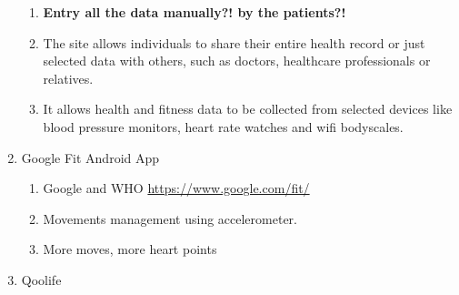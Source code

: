 \documentclass[10pt, twoside]{article}   	%
\begin{document}
\begin{enumerate}
\begin{enumerate}
               \item \textbf{Entry all the data manually?! by the patients?!}
               \item The site allows individuals to share their entire health record or just selected data with others, such as doctors, healthcare professionals or relatives.
               \item It allows health and fitness data to be collected from selected devices like blood pressure monitors, heart rate watches and wifi bodyscales.
           \end{enumerate}
       \item Google Fit Android App
           \begin{enumerate}
               \item Google and WHO \url{https://www.google.com/fit/}
               \item Movements management using accelerometer. 
               \item More moves, more heart points
           \end{enumerate}
     \item  Qoolife
       \end {enumerate}   
\end{document}
